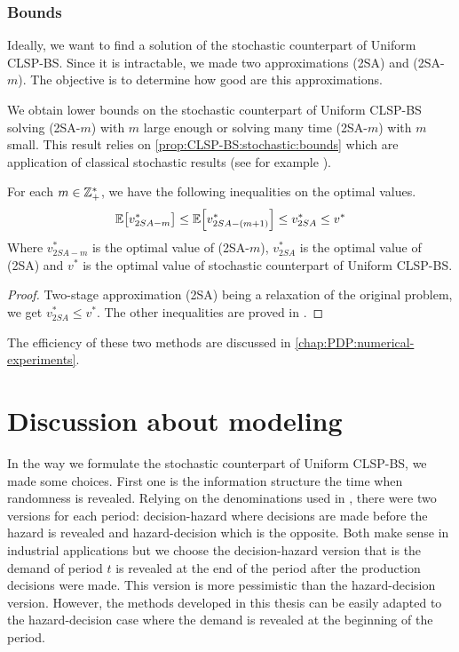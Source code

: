 


\subsubsection{Bounds}


Ideally, we want to find a solution of the stochastic counterpart of Uniform CLSP-BS.
Since it is intractable, we made two approximations (2SA) and (2SA-$m$).
The objective is to determine how good are this approximations.


We obtain lower bounds on the stochastic counterpart of Uniform CLSP-BS solving (2SA-$m$) with $m$ large enough or solving many time (2SA-$m$) with $m$ small.
This result relies on \cref{prop:CLSP-BS:stochastic:bounds} which are application of classical stochastic results (see for example \cite{Shapiro2009}).

\begin{prop}\label{prop:CLSP-BS:stochastic:bounds}
For each $m\in\mathbb{Z}_+^*$, we have the following inequalities on the optimal values.
\begin{equation}
  \espe\sqbracket{v^*_{2SA-m}}
  \le\espe\sqbracket{v^*_{2SA-(m+1)}}
  \le v^*_{2SA}
  \le v^*
\end{equation}
Where $v^*_{2SA-m}$ is the optimal value of (2SA-$m$), $v^*_{2SA}$ is the optimal value of (2SA) and $v^*$ is the optimal value of stochastic counterpart of Uniform CLSP-BS.
\end{prop}


\begin{proof}
Two-stage approximation (2SA) being a relaxation of the original problem, we get $v^*_{2SA} \le v^*$. The other inequalities are proved in \cite[Proposition 5.6]{Shapiro2009}.
\end{proof}


The efficiency of these two methods are discussed in \cref{chap:PDP:numerical-experiments}.



\section{Discussion about modeling}
\label{sec:stoch-CLSP-BS-discussion}

In the way we formulate the stochastic counterpart of Uniform CLSP-BS, we made some choices.
First one is the information structure \ie the time when randomness is revealed.
Relying on the denominations used in \cite{Carpentier2015}, there were two versions for each period: decision-hazard where decisions are made before the hazard is revealed and hazard-decision which is the opposite.
Both make sense in industrial applications but we choose the decision-hazard version that is the demand of period $t$ is revealed at the end of the period after the production decisions were made.
This version is more pessimistic than the hazard-decision version.
However, the methods developed in this thesis can be easily adapted to the hazard-decision case where the demand is revealed at the beginning of the period.


